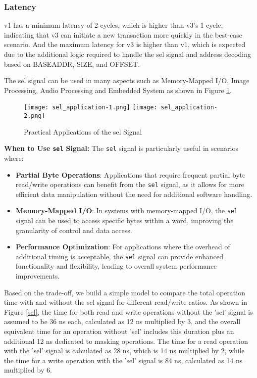 \documentclass[conference]{IEEEtran}
\begin{document}
\subsubsection{Latency}
v1 has a minimum latency of 2 cycles, which is higher than v3's 1 cycle, indicating that v3 can initiate a new transaction more quickly in the best-case scenario. And the maximum latency for v3 is higher than v1, which is expected due to the additional logic required to handle the sel signal and address decoding based on BASEADDR, SIZE, and OFFSET.


The sel signal can be used in many aspects such as Memory-Mapped I/O, Image Processing, Audio Processing and Embedded System as shown in Figure \ref{sel_application}. \cite{mmio}

\begin{figure}[h] 
    \centering
    \texttt{[image: sel\_application-1.png]}
    \texttt{[image: sel\_application-2.png]}
    \caption{Practical Applications of the sel Signal}
    \label{sel_application}
\end{figure}

\textbf{When to Use \texttt{sel} Signal:}
The \texttt{sel} signal is particularly useful in scenarios where:
\begin{itemize}
    \item \textbf{Partial Byte Operations}: Applications that require frequent partial byte read/write operations can benefit from the \texttt{sel} signal, as it allows for more efficient data manipulation without the need for additional software handling.
    \item \textbf{Memory-Mapped I/O}: In systems with memory-mapped I/O, the \texttt{sel} signal can be used to access specific bytes within a word, improving the granularity of control and data access.
    \item \textbf{Performance Optimization}: For applications where the overhead of additional timing is acceptable, the \texttt{sel} signal can provide enhanced functionality and flexibility, leading to overall system performance improvements.
\end{itemize}

Based on the trade-off, we build a simple model to compare the total operation time with and without the sel signal for different read/write ratios. As shown in Figure \ref{sel}, the time for both read and write operations without the 'sel' signal is assumed to be 36 ns each, calculated as 12 ns multiplied by 3, and the overall equivalent time for an operation without 'sel' includes this duration plus an additional 12 ns dedicated to masking operations. The time for a read operation with the 'sel' signal is calculated as 28 ns, which is 14 ns multiplied by 2, while the time for a write operation with the 'sel' signal is 84 ns, calculated as 14 ns multiplied by 6.
\end{document}

